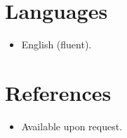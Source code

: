 \documentclass[11pt,a4paper,sans]{moderncv}
\begin{document}

\section{Languages}
\vspace{1pt}
\begin{itemize}
\item {English (fluent).}
\end{itemize}


\section{References}
\vspace{1pt}
\begin{itemize}
\item{Available upon request.}
\end{itemize}
\end{document}
